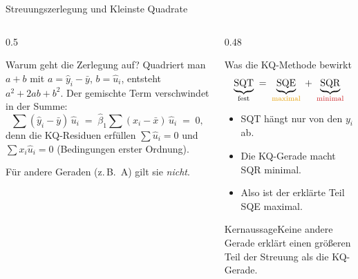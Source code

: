 \documentclass[aspectratio=169,11pt]{beamer}
\newcommand{\kernaussage}[1]{\begin{alertblock}{Kernaussage}#1\end{alertblock}}
\begin{document}
\begin{frame}{Streuungszerlegung und Kleinste Quadrate}
  \begin{columns}[T]
    \begin{column}{0.5\textwidth}
      \small
      \begin{block}{Warum geht die Zerlegung auf?}
        Quadriert man $a + b$ mit $a = \hat{y}_i - \bar{y}$, $b = \hat{u}_i$,
        entsteht $a^{2} + 2ab + b^{2}$. Der gemischte Term verschwindet in der Summe:
        \[
          \sum (\hat{y}_i - \bar{y})\,\hat{u}_i
          \;=\; \hat{\beta}_1 \sum (x_i - \bar{x})\,\hat{u}_i \;=\; 0,
        \]
        denn die KQ-Residuen erfüllen $\sum \hat{u}_i = 0$ und
        $\sum x_i \hat{u}_i = 0$ (Bedingungen erster Ordnung).
      \end{block}
      \footnotesize Für andere Geraden (z.\,B.\ A) gilt sie \emph{nicht}.
    \end{column}
    \begin{column}{0.48\textwidth}
      \small
      \begin{block}{Was die KQ-Methode bewirkt}
        \vspace{-6pt}
        \[
          \underbrace{\text{SQT}}_{\text{fest}}
          \;=\;
          \underbrace{\text{SQE}}_{\color{hsbiaccent}\text{maximal}}
          \;+\;
          \underbrace{\text{SQR}}_{\color{resred}\text{minimal}}
        \]
        \vspace{-8pt}
        \begin{itemize}
          \item SQT hängt nur von den $y_i$ ab.
          \item Die KQ-Gerade macht SQR minimal.
          \item Also ist der erklärte Teil SQE maximal.
        \end{itemize}
      \end{block}
      \kernaussage{Keine andere Gerade erklärt einen größeren Teil der
        Streuung als die KQ-Gerade.}
    \end{column}
  \end{columns}
\end{frame}
\end{document}
